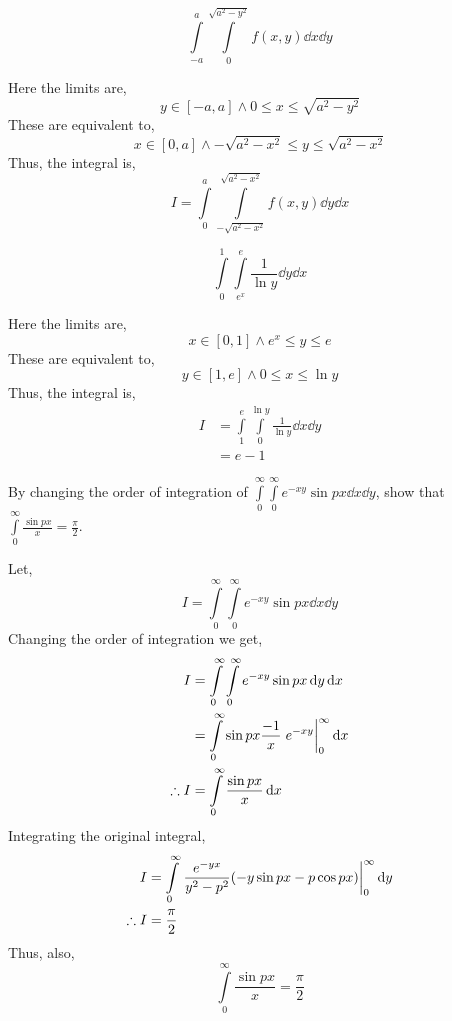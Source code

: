 \begin{asign}
	\[\int\limits_{-a}^a\int\limits_0^{\sqrt{a^2-y^2}}f(x,y)\dd{x}\dd{y}\]
\end{asign}
\begin{anse}
	Here the limits are,
	\[y\in[-a,a]\land 0\leq x\leq \sqrt{a^2-y^2}\]
	These are equivalent to,
	\[x\in[0,a]\land -\sqrt{a^2-x^2}\leq y\leq \sqrt{a^2-x^2}\]
	Thus, the integral is,
	\[I=\int\limits_0^a\int\limits_{-\sqrt{a^2-x^2}}^{\sqrt{a^2-x^2}}f(x,y)\dd{y}\dd{x}\]
\end{anse}
\begin{asign}
	\[\int\limits_0^1\int\limits_{e^x}^e\frac{1}{\ln y}\dd{y}\dd{x}\]
\end{asign}
\begin{anse}
	Here the limits are,
	\[x\in[0,1]\land e^x\leq y\leq e\]
	These are equivalent to,
	\[y\in[1,e]\land 0\leq x\leq \ln y\]
	Thus, the integral is,
	\[\begin{split}
		I&=\int\limits_1^e\int\limits_0^{\ln y}\frac{1}{\ln y}\dd{x}\dd{y}\\
		&=e-1
	\end{split}\]
\end{anse}
\begin{asign}
	By changing the order of integration of $\int\limits_0^\infty\int\limits_0^\infty e^{-xy}\sin px\dd{x}\dd{y}$, show that $\int\limits_0^\infty \frac{\sin px}{x}=\frac{\pi}{2}$.
\end{asign}
\begin{anse}
	Let,
	\[I=\int\limits_0^\infty\int\limits_0^\infty e^{-xy}\sin px\dd{x}\dd{y}\]
	Changing the order of integration we get,
	\[\begin{split}
		I&=\int\limits_0^\infty\int\limits_0^\infty e^{-xy}\sin px\dd{y}\dd{x}\\
		&=\int\limits_0^\infty \sin px \frac{-1}{x}\eval{e^{-xy}}_{0}^{\infty}\dd{x}\\
		\therefore I&=\int\limits_0^\infty \frac{\sin px}{x}\dd{x}
	\end{split}\]
	Integrating the original integral,
	\[\begin{split}
		I&=\int\limits_0^\infty \eval{\frac{e^{-yx}}{y^2-p^2}(-y\sin px-p\cos px)}_{0}^{\infty} \dd{y}\\
		\therefore I&=\frac{\pi}{2}
	\end{split}\]
	Thus, also,
	\[\int\limits_0^\infty \frac{\sin px}{x}=\frac{\pi}{2}\]
\end{anse}
